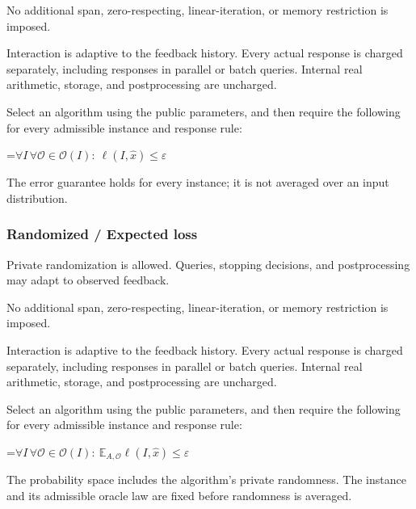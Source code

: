 \documentclass[10pt,a4paper]{article}
\newcommand{\AtlasMath}[1]{\par\begingroup\centering\setbox0=\hbox{$\displaystyle #1$}\ifdim\wd0>1.4\linewidth\typeout{ATLAS WIDE FORMULA: \the\wd0}\fi\ifdim\wd0>\linewidth\resizebox{\linewidth}{!}{\box0}\else\box0\fi\par\endgroup}
\begin{document}
No additional span, zero-respecting, linear-iteration, or memory restriction is imposed.



Interaction is adaptive to the feedback history. Every actual response is charged separately, including responses in parallel or batch queries. Internal real arithmetic, storage, and postprocessing are uncharged.



Select an algorithm using the public parameters, and then require the following for every admissible instance and response rule:




\AtlasMath{\forall I\,\forall\mathcal{O}\in\mathcal{O}(I):\ \ell(I,\widehat{x})\le\varepsilon}




The error guarantee holds for every instance; it is not averaged over an input distribution.



\subsubsection{Randomized / Expected loss}


Private randomization is allowed. Queries, stopping decisions, and postprocessing may adapt to observed feedback.



No additional span, zero-respecting, linear-iteration, or memory restriction is imposed.



Interaction is adaptive to the feedback history. Every actual response is charged separately, including responses in parallel or batch queries. Internal real arithmetic, storage, and postprocessing are uncharged.



Select an algorithm using the public parameters, and then require the following for every admissible instance and response rule:




\AtlasMath{\forall I\,\forall\mathcal{O}\in\mathcal{O}(I):\ \mathbb{E}_{A,\mathcal{O}}\ell(I,\widehat{x})\le\varepsilon}




The probability space includes the algorithm's private randomness. The instance and its admissible oracle law are fixed before randomness is averaged.
\end{document}

